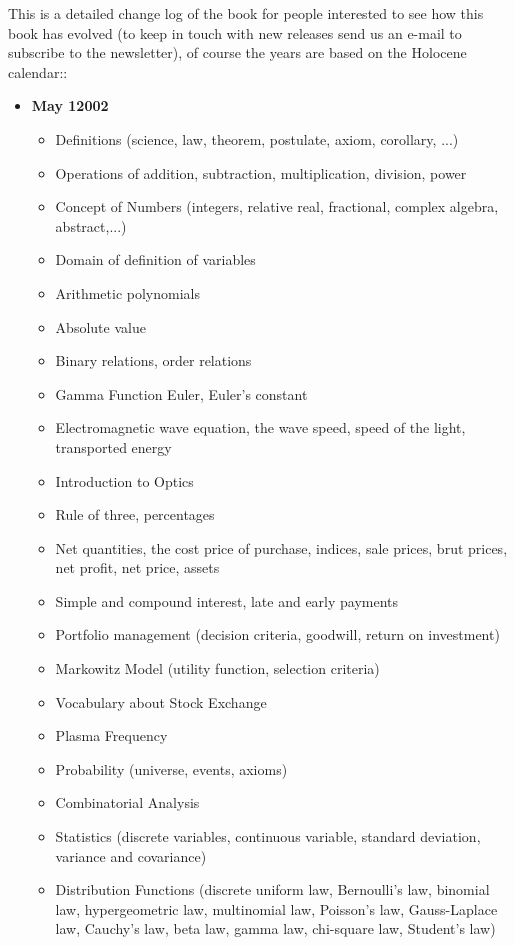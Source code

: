 This is a detailed change log of the book for people interested to see how this book has evolved (to keep in touch with new releases send us an e-mail to subscribe to the newsletter), of course the years are based on the Holocene calendar::
	\begin{itemize}
		\item \textbf{May 12002}
			\begin{itemize}[noitemsep]
				\item Definitions (science, law, theorem, postulate, axiom, corollary, ...)
				\item Operations of addition, subtraction, multiplication, division, power
				\item Concept of Numbers (integers, relative real, fractional, complex algebra, abstract,...)
				\item Domain of definition of variables
				\item Arithmetic polynomials
				\item Absolute value
				\item Binary relations, order relations
				\item Gamma Function Euler, Euler's constant
				\item Electromagnetic wave equation, the wave speed, speed of the light, transported energy
				\item Introduction to Optics
				\item Rule of three, percentages
				\item Net quantities, the cost price of purchase, indices, sale prices, brut prices, net profit, net price, assets
				\item Simple and compound interest, late and early payments
				\item Portfolio management (decision criteria, goodwill, return on investment)
				\item Markowitz Model (utility function, selection criteria)
				\item Vocabulary about Stock Exchange
				\item Plasma Frequency
				\item Probability (universe, events, axioms)
				\item Combinatorial Analysis
				\item Statistics (discrete variables, continuous variable, standard deviation, variance and covariance)
				\item Distribution Functions (discrete uniform law, Bernoulli's law, binomial law, hypergeometric law, multinomial law, Poisson's law, Gauss-Laplace law, Cauchy's law, beta law, gamma law, chi-square law, Student's law)

\end{itemize}
\end{itemize}
